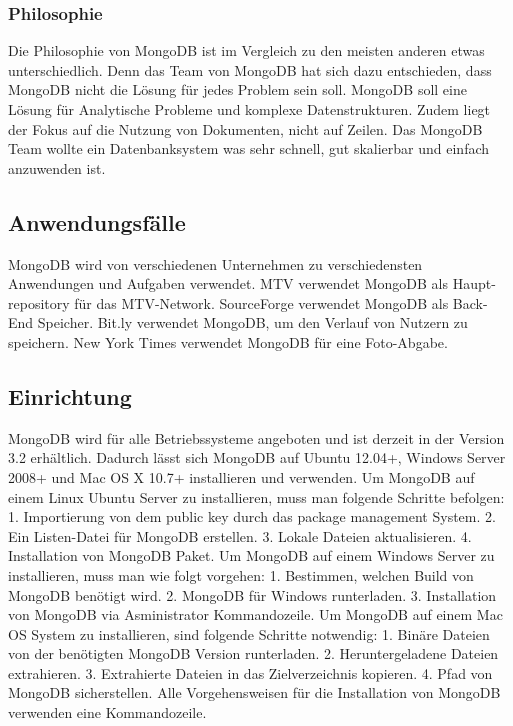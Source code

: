 \subsubsection{Philosophie}
Die Philosophie von MongoDB ist im Vergleich zu den meisten anderen etwas unterschiedlich. Denn das Team von MongoDB hat sich dazu entschieden, dass MongoDB nicht die Lösung für jedes Problem sein soll. MongoDB soll eine Lösung für Analytische Probleme und komplexe Datenstrukturen. Zudem liegt der Fokus auf die Nutzung von Dokumenten, nicht auf Zeilen. Das MongoDB Team wollte ein Datenbanksystem was sehr schnell, gut skalierbar und einfach anzuwenden ist.
\subsection{Anwendungsfälle}
MongoDB wird von verschiedenen Unternehmen zu verschiedensten Anwendungen und Aufgaben verwendet.
MTV verwendet MongoDB als Haupt-repository für das MTV-Network.
SourceForge verwendet MongoDB als Back-End Speicher.
Bit.ly verwendet MongoDB, um den Verlauf von Nutzern zu speichern.
New York Times verwendet MongoDB  für eine Foto-Abgabe.
\subsection{Einrichtung}
MongoDB wird für alle Betriebssysteme angeboten und ist derzeit in der Version 3.2 erhältlich. Dadurch lässt sich MongoDB auf Ubuntu 12.04+, Windows Server 2008+ und Mac OS X 10.7+ installieren und verwenden. 
Um MongoDB auf einem Linux Ubuntu Server zu installieren, muss man folgende Schritte befolgen:
1. Importierung von dem public key durch das package management System.
2. Ein Listen-Datei für MongoDB erstellen.
3. Lokale Dateien aktualisieren.
4. Installation von MongoDB Paket.
Um MongoDB auf einem Windows Server zu installieren, muss man wie folgt vorgehen:
1. Bestimmen, welchen Build von MongoDB benötigt wird.
2. MongoDB für Windows runterladen.
3. Installation von MongoDB via Asministrator Kommandozeile.
Um MongoDB auf einem Mac OS System zu installieren, sind folgende Schritte notwendig:
1. Binäre Dateien von der benötigten MongoDB Version runterladen.
2. Heruntergeladene Dateien extrahieren.
3. Extrahierte Dateien in das Zielverzeichnis kopieren.
4. Pfad von MongoDB sicherstellen.
Alle Vorgehensweisen für die Installation von MongoDB verwenden eine Kommandozeile.
